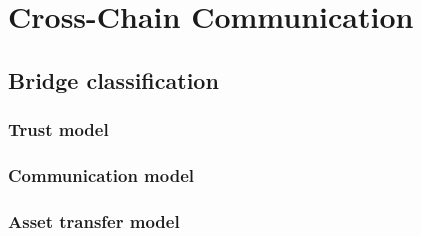 \section{Cross-Chain Communication}
\label{sec:cross_chain_communication}

\subsection{Bridge classification}
\label{subsec:bridge_classification}

\subsubsection{Trust model}
\label{subsubsec:trust_model}

\subsubsection{Communication model}
\label{subsubsec:communication_model}

\subsubsection{Asset transfer model}
\label{subsubsec:asset_transfer_model}

